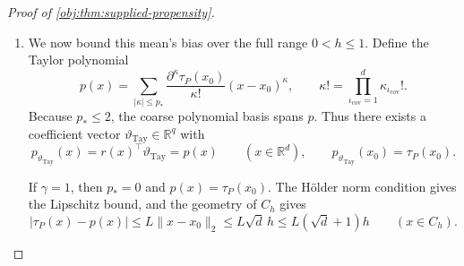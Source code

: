 \begin{proof}[Proof of \cref{obj:thm:supplied-propensity}]
\begin{enumerate}
On the design cube, overlap and the binary record coordinates give
\[
|Z_P(x,a_{\mathrm{obs}},y_{\mathrm{obs}})|\le\varepsilon^{-1}.
\]
Outside the cube, the zero extension of the propensity gives
\[
Z_P(x,a_{\mathrm{obs}},y_{\mathrm{obs}})
=-(1-a_{\mathrm{obs}})y_{\mathrm{obs}},
\qquad
|Z_P(x,a_{\mathrm{obs}},y_{\mathrm{obs}})|\le1\le\varepsilon^{-1}.
\]
Hence the response bound is global, and
\[
|F_{P,h}(x,a_{\mathrm{obs}},y_{\mathrm{obs}})|
\le\varepsilon^{-1}h^{-d}K_{\mathrm{ev}}.
\]
Borel measurability and this bound supply all integrability and finite second moments used below.

For \(0<h\le1\), exchangeability and the conditional-margin identities in
\cref{obj:def:primitive-class}, followed by cancellation of the overlap denominators, give
\[
\mathbb E_P\left[
w_h(X)\mathcal K_h(X)\frac{AY}{e_P(X)}
\right]
=
\int_{[0,1]^d}w_h(x)\mathcal K_h(x)\mu_{1,P}(x)\,dx,
\]
\[
\mathbb E_P\left[
w_h(X)\mathcal K_h(X)\frac{(1-A)Y}{1-e_P(X)}
\right]
=
\int_{[0,1]^d}w_h(x)\mathcal K_h(x)\mu_{0,P}(x)\,dx.
\]
Subtracting and using the canonical contrast identity gives
\[
\mathbb E_P[F_{P,h}(X,A,Y)]
=
\int\mathcal K_h(x)\tau_P(x)\,d\nu_h(x).
\]
Every labeled coordinate has this expectation, while the auxiliary block and randomizer integrate out as probability factors. Since \(n>0\),
\[
\mu_{P,h}
=
\int\mathcal K_h(x)\tau_P(x)\,d\nu_h(x).
\]

\item We now bound this mean's bias over the full range \(0<h\le1\). Define the Taylor polynomial
\[
p(x)=
\sum_{|\kappa|\le p_*}
\frac{\partial^\kappa\tau_P(x_0)}{\kappa!}
(x-x_0)^\kappa,
\qquad
\kappa!=\prod_{\iota_{\mathrm{cov}}=1}^d\kappa_{\iota_{\mathrm{cov}}}!.
\]
Because \(p_*\le2\), the coarse polynomial basis spans \(p\). Thus there exists a coefficient vector \(\vartheta_{\mathrm{Tay}}\in\mathbb R^q\) with
\[
p_{\vartheta_{\mathrm{Tay}}}(x)
=
r(x)^\top\vartheta_{\mathrm{Tay}}
=
p(x)
\qquad(x\in\mathbb R^d),
\qquad
p_{\vartheta_{\mathrm{Tay}}}(x_0)=\tau_P(x_0).
\]

If \(\gamma=1\), then \(p_*=0\) and \(p(x)=\tau_P(x_0)\). The Hölder norm condition gives the Lipschitz bound, and the geometry of \(C_h\) gives
\[
|\tau_P(x)-p(x)|
\le L\|x-x_0\|_2
\le L\sqrt d\,h
\le L(\sqrt d+1)h
\qquad(x\in C_h).
\]


\end{enumerate}
\end{proof}
